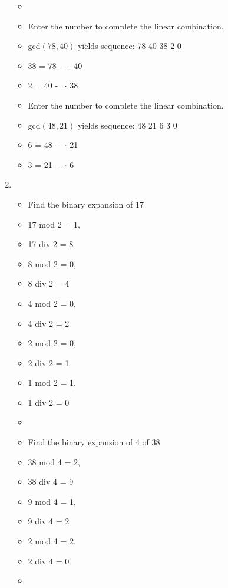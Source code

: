 \documentclass[12pt,a4paper]{article}
\begin{document}
\begin{enumerate}
\begin{itemize}
    \item[]      
    \item Enter the number to complete the linear combination.
    \item[] gcd\((78,40)\) yields sequence: 78 40 38 2 0  
    \item[] 38 = 78 -\  \(\cdot \) 40
    \item[] 2 = 40 -\  \(\cdot \) 38  
    \item Enter the number to complete the linear combination.
    \item[] gcd\((48, 21)\) yields sequence: 48 21 6 3 0 
    \item[] 6 = 48 -\  \(\cdot \) 21
    \item[] 3 = 21 -\  \(\cdot \) 6  
  \end{itemize}
  \clearpage
  \item {}
  \begin{itemize}
    \item Find the binary expansion of 17
    \item[] 17 mod 2 = 1, 
    \item[] 17 div 2 = 8
    \item[] 8 mod 2 = 0, 
    \item[] 8 div 2 = 4
    \item[] 4 mod 2 = 0, 
    \item[] 4 div 2 = 2
    \item[] 2 mod 2 = 0, 
    \item[] 2 div 2 = 1
    \item[] 1 mod 2 = 1, 
    \item[] 1 div 2 = 0
    \item[] 
    \item Find the binary expansion of 4 of 38
    \item[] 38 mod 4 = 2, 
    \item[] 38 div 4 = 9
    \item[] 9 mod 4 = 1, 
    \item[] 9 div 4 = 2
    \item[] 2 mod 4 = 2, 
    \item[] 2 div 4 = 0
    \item[]          
  \end{itemize}

\end{enumerate}
\end{document}
